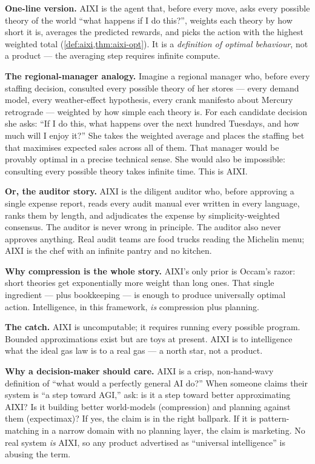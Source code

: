 \documentclass[12pt,a4paper]{article}
\theoremstyle{plain}
\theoremstyle{definition}
\begin{document}
\begin{intuition}
\textbf{One-line version.}  AIXI is the agent that, before every move,
asks every possible theory of the world ``what happens if I do this?'',
weights each theory by how short it is, averages the predicted rewards,
and picks the action with the highest weighted total
(\cref{def:aixi,thm:aixi-opt}).  It is a \emph{definition of optimal
behaviour}, not a product --- the averaging step requires infinite
compute.

\textbf{The regional-manager analogy.}  Imagine a regional manager who,
before every staffing decision, consulted every possible theory of her
stores --- every demand model, every weather-effect hypothesis, every
crank manifesto about Mercury retrograde --- weighted by how simple
each theory is.  For each candidate decision she asks: ``If I do this,
what happens over the next hundred Tuesdays, and how much will I enjoy
it?''  She takes the weighted average and places the staffing bet that
maximises expected sales across all of them.  That manager would be
provably optimal in a precise technical sense.  She would also be
impossible: consulting every possible theory takes infinite time.
This is AIXI.

\textbf{Or, the auditor story.}  AIXI is the diligent auditor who,
before approving a single expense report, reads every audit manual
ever written in every language, ranks them by length, and adjudicates
the expense by simplicity-weighted consensus.  The auditor is never
wrong in principle.  The auditor also never approves anything.  Real
audit teams are food trucks reading the Michelin menu; AIXI is the
chef with an infinite pantry and no kitchen.

\textbf{Why compression is the whole story.}  AIXI's only prior is
Occam's razor: short theories get exponentially more weight than long
ones.  That single ingredient --- plus bookkeeping --- is enough to
produce universally optimal action.  Intelligence, in this framework,
\emph{is} compression plus planning.

\textbf{The catch.}  AIXI is uncomputable; it requires running every
possible program.  Bounded approximations exist but are toys at
present.  AIXI is to intelligence what the ideal gas law is to a real
gas --- a north star, not a product.

\textbf{Why a decision-maker should care.}  AIXI is a crisp,
non-hand-wavy definition of ``what would a perfectly general AI do?''
When someone claims their system is ``a step toward AGI,'' ask: is it
a step toward better approximating AIXI?  Is it building better
world-models (compression) and planning against them (expectimax)?  If
yes, the claim is in the right ballpark.  If it is pattern-matching in
a narrow domain with no planning layer, the claim is marketing.  No
real system \emph{is} AIXI, so any product advertised as ``universal
intelligence'' is abusing the term.
\end{intuition}
\end{document}
